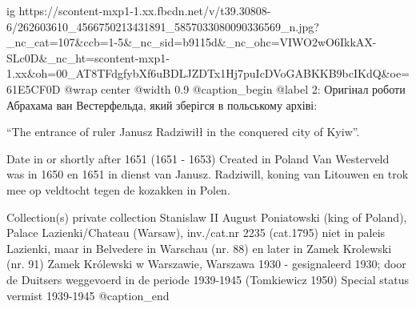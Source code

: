  
 
 
 
 

\ifcmt
  ig https://scontent-mxp1-1.xx.fbcdn.net/v/t39.30808-6/262603610_4566750213431891_5857033080090336569_n.jpg?_nc_cat=107&ccb=1-5&_nc_sid=b9115d&_nc_ohc=VIWO2wO6IkkAX-SLc0D&_nc_ht=scontent-mxp1-1.xx&oh=00_AT8TFdgfybXf6uBDLJZDTx1Hj7puIcDVoGABKKB9bcIKdQ&oe=61E5CF0D
  @wrap center
  @width 0.9
  @caption_begin
    @label 2:
Оригінал роботи Абрахама ван Вестерфельда, який зберігся в польському архіві:

\enquote{The entrance of ruler Janusz Radziwiłł in the conquered city of Kyiw}.

Date in or shortly after 1651 (1651 - 1653) Created in Poland Van Westerveld
was in 1650 en 1651 in dienst van Janusz. Radziwill, koning van Litouwen en
trok mee op veldtocht tegen de kozakken in Polen.

Collection(s) private collection Stanislaw II August Poniatowski (king of
Poland), Palace Lazienki/Chateau (Warsaw), inv./cat.nr 2235 (cat.1795) niet in
paleis Lazienki, maar in Belvedere in Warschau (nr. 88) en later in Zamek
Krolewski (nr. 91) Zamek Królewski w Warszawie, Warszawa 1930 - gesignaleerd
1930; door de Duitsers weggevoerd in de periode 1939-1945 (Tomkiewicz 1950)
Special status vermist 1939-1945
  @caption_end
\fi

